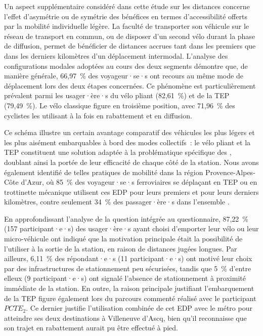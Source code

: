 \begin{refsegment}
Un aspect supplémentaire considéré dans cette étude sur les distances concerne l'effet d'asymétrie ou de symétrie des bénéfices en termes d'accessibilité offerts par la mobilité individuelle légère. La faculté de transporter son véhicule sur le réseau de transport en commun, ou de disposer d'un second vélo durant la phase de diffusion, permet de bénéficier de distances accrues tant dans les premiers que dans les derniers kilomètres d'un déplacement intermodal. L'analyse des configurations modales adoptées au cours des deux segments démontre que, de manière générale, 66,97~\% des voyageur·se·s ont recours au même mode de déplacement lors des deux étapes concernées. Ce phénomène est particulièrement prévalent parmi les usager·ère·s du vélo pliant (82,61~\%) et de la \acrshort{TEP} (79,49~\%). Le vélo classique figure en troisième position, avec 71,96~\% des cyclistes les utilisant à la fois en rabattement et en diffusion.%

Ce schéma illustre un certain avantage comparatif des véhicules les plus légers et les plus aisément embarquables à bord des modes collectifs~: le vélo pliant et la \acrshort{TEP} constituent une solution adaptée à la problématique spécifique des , doublant ainsi la portée de leur efficacité de chaque côté de la station. Nous avons également identifié de telles pratiques de mobilité dans la région Provence-Alpes-Côte d'Azur, où 85~\% des voyageur·se·s ferroviaires se déplaçant en \acrshort{TEP} ou en trottinette mécanique utilisent ces \acrshort{EDP} pour leurs premiers et pour leurs derniers kilomètres, contre seulement 34~\% des passager·ère·s dans l'ensemble \textcolor{blue}{\autocite[185]{moinse_intermodal_2022}}.%

En approfondissant l'analyse de la question  intégrée au questionnaire, 87,22~\% (157 participant·e·s) des usager·ère·s ayant choisi d'emporter leur vélo ou leur micro-véhicule ont indiqué que la motivation principale était la possibilité de l'utiliser à la sortie de la station, en raison de distances jugées longues. Par ailleurs, 6,11~\% des répondant·e·s (11 participant·e·s) ont motivé leur choix par des infrastructures de stationnement peu sécurisées, tandis que 5~\% d'entre elleux (9 participant·e·s) ont signalé l'absence de stationnement à proximité immédiate de la station. En outre, la raison principale justifiant l'embarquement de la \acrshort{TEP} figure également lors du parcours commenté réalisé avec le participant \(PCTE_{2}\). Ce dernier justifie l'utilisation combinée de cet \acrshort{EDP} avec le métro pour atteindre ses deux destinations à Villeneuve d'Ascq, bien qu'il reconnaisse que son trajet en rabattement aurait pu être effectué à pied.%


\end{refsegment}
